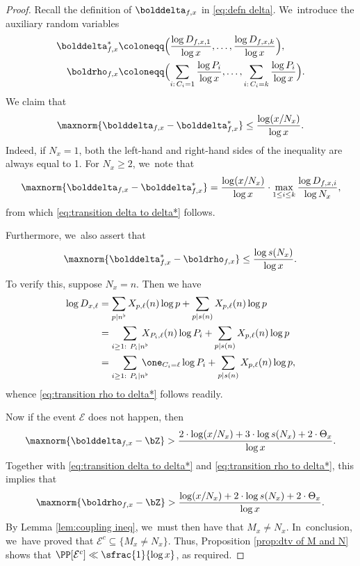 \begin{proof}
Recall the definition of $\bolddelta_{f, x}$ in \eqref{eq:defn delta}. We~introduce the auxiliary random variables
\begin{equation}
\label{eq:defn delta* and rho}
\begin{aligned}
\bolddelta_{f, x}^* &\coloneqq \Bigl(\frac{\log D_{f,x,1}}{\log x}, \ldots, \frac{\log D_{f,x,k}}{\log x} \Bigr),\\
\boldrho_{f, x} &\coloneqq \Bigl(\sum_{i:\, C_i=1} \frac{\log P_i}{\log x}, \ldots, \sum_{i:\, C_i=k} \frac{\log P_i}{\log x} \Bigr).
\end{aligned}
\end{equation}
We claim that
\begin{equation}
\label{eq:transition delta to delta*}
\maxnorm{ \bolddelta_{f, x} - \bolddelta_{f, x}^*} \le \frac{\log(x/N_x)}{\log x}.
\end{equation}
Indeed, if $N_x = 1$, both the left-hand and right-hand sides of the inequality are always equal to 1. For $N_x \ge 2$, we~note that
\[
\maxnorm{ \bolddelta_{f, x} - \bolddelta_{f, x}^*} = \frac{\log(x/N_x)}{\log x} \cdot \max_{1 \le i \le k} \frac{\log D_{f,x,i}}{\log N_x},
\]
from which \eqref{eq:transition delta to delta*} follows.

Furthermore, we~also assert that
\begin{equation}
\label{eq:transition rho to delta*}
\maxnorm{\bolddelta_{f, x}^* - \boldrho_{f, x}} \le \frac{\log s(N_x)}{\log x}.
\end{equation}
To verify this, suppose $N_x=n$. Then we have
\begin{align*}
\log D_{x,\ell} &= \sum_{p|n^\flat} X_{p, \ell}(n) \log p + \sum_{p|s(n)} X_{p, \ell}(n) \log p \\
&=\sum_{i\ge1:\ P_i|n^\flat}\hspace*{-3mm} X_{P_i, \ell}(n) \log P_i + \sum_{p|s(n)} X_{p,\ell}(n) \log p \\
&=\sum_{i\ge1:\ P_i|n^\flat}\hspace*{-3mm} \one_{C_i=\ell} \log P_i + \sum_{p|s(n)} X_{p,\ell}(n) \log p,
\end{align*}
whence \eqref{eq:transition rho to delta*} follows readily.

Now if the event $\mathcal E$ does not happen, then
\[
\maxnorm{\bolddelta_{f, x} - \bZ} > \frac{2 \cdot \log(x/N_x) + 3 \cdot \log s(N_x) + 2\cdot \Theta_x}{\log x}.
\]
Together with \eqref{eq:transition delta to delta*} and \eqref{eq:transition rho to delta*}, this implies that
\[
\maxnorm{\boldrho_{f, x} - \bZ} > \frac{\log(x/N_x) + 2 \cdot \log s(N_x) + 2\cdot \Theta_x}{\log x}.
\]
By Lemma \ref{lem:coupling ineq}, we~must then have that $M_x \ne N_x$. In~conclusion, we~have proved that $\mathcal{E}^c\subseteq\{M_x\ne N_x\}$. Thus, Proposition \ref{prop:dtv of M and N} shows that $\PP[\mathcal E^c] \ll \sfrac{1}{\log x}$, as required.
\end{proof}

